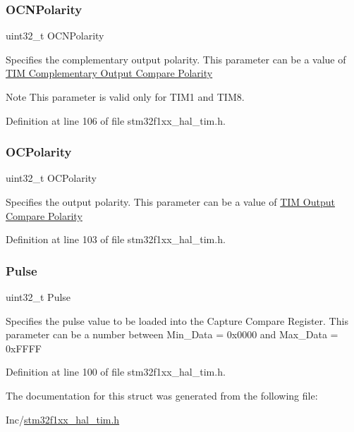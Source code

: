 \subsubsection{\texorpdfstring{O\+C\+N\+Polarity}{OCNPolarity}}
{\footnotesize\ttfamily uint32\+\_\+t O\+C\+N\+Polarity}

Specifies the complementary output polarity. This parameter can be a value of \hyperlink{group___t_i_m___output___compare___n___polarity}{T\+IM Complementary Output Compare Polarity} \begin{DoxyNote}{Note}
This parameter is valid only for T\+I\+M1 and T\+I\+M8. 
\end{DoxyNote}


Definition at line 106 of file stm32f1xx\+\_\+hal\+\_\+tim.\+h.

\mbox{\label{struct_t_i_m___o_c___init_type_def_a781c7dae9dec8b6c974b1bdf591b77e7}} 
\subsubsection{\texorpdfstring{O\+C\+Polarity}{OCPolarity}}
{\footnotesize\ttfamily uint32\+\_\+t O\+C\+Polarity}

Specifies the output polarity. This parameter can be a value of \hyperlink{group___t_i_m___output___compare___polarity}{T\+IM Output Compare Polarity} 

Definition at line 103 of file stm32f1xx\+\_\+hal\+\_\+tim.\+h.

\mbox{\label{struct_t_i_m___o_c___init_type_def_a5251c3bce4ca5baf013bc0ace0865a4c}} 
\subsubsection{\texorpdfstring{Pulse}{Pulse}}
{\footnotesize\ttfamily uint32\+\_\+t Pulse}

Specifies the pulse value to be loaded into the Capture Compare Register. This parameter can be a number between Min\+\_\+\+Data = 0x0000 and Max\+\_\+\+Data = 0x\+F\+F\+FF 

Definition at line 100 of file stm32f1xx\+\_\+hal\+\_\+tim.\+h.



The documentation for this struct was generated from the following file\+:\begin{DoxyCompactItemize}
\item 
Inc/\hyperlink{stm32f1xx__hal__tim_8h}{stm32f1xx\+\_\+hal\+\_\+tim.\+h}\end{DoxyCompactItemize}
